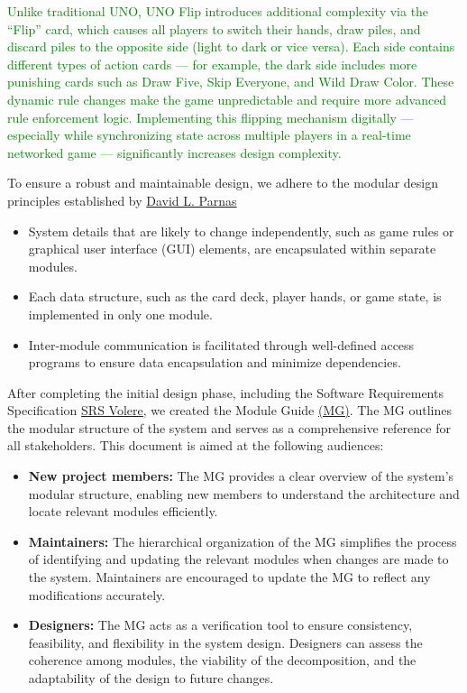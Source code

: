 \documentclass[12pt, titlepage]{article}
\newcommand{\added}[1]{\textcolor{green}{#1}}
\begin{document}
\added{Unlike traditional UNO, UNO Flip introduces additional complexity via the “Flip” card, which causes all players to switch their hands, draw piles, and discard piles to the opposite side (light to dark or vice versa). Each side contains different types of action cards — for example, the dark side includes more punishing cards such as Draw Five, Skip Everyone, and Wild Draw Color. These dynamic rule changes make the game unpredictable and require more advanced rule enforcement logic. Implementing this flipping mechanism digitally — especially while synchronizing state across multiple players in a real-time networked game — significantly increases design complexity.}

To ensure a robust and maintainable design, we adhere to the modular design principles established by \href{https://cabibbo.dia.uniroma3.it/asw/altrui/parnas-1972.pdf}{David L. Parnas}

\begin{itemize}
\item System details that are likely to change independently, such as game rules or graphical user interface (GUI) elements, are encapsulated within separate modules.
\item Each data structure, such as the card deck, player hands, or game state, is implemented in only one module.
\item Inter-module communication is facilitated through well-defined access programs to ensure data encapsulation and minimize dependencies.
\end{itemize}

After completing the initial design phase, including the Software Requirements Specification 
\href{https://github.com/simon-0215/UNO-Flip-3D/tree/main/docs/SRS-Volere}{SRS Volere}, we created the Module Guide \href{https://github.com/simon-0215/UNO-Flip-3D/blob/main/docs/Design/SoftArchitecture/MG.pdf}{(MG)}. The MG outlines the modular structure of the system and serves as a comprehensive reference for all stakeholders. This document is aimed at the following audiences:

\begin{itemize}
\item \textbf{New project members:} The MG provides a clear overview of the system's modular structure, enabling new members to understand the architecture and locate relevant modules efficiently.
\item \textbf{Maintainers:} The hierarchical organization of the MG simplifies the process of identifying and updating the relevant modules when changes are made to the system. Maintainers are encouraged to update the MG to reflect any modifications accurately.
\item \textbf{Designers:} The MG acts as a verification tool to ensure consistency, feasibility, and flexibility in the system design. Designers can assess the coherence among modules, the viability of the decomposition, and the adaptability of the design to future changes.
\end{itemize}
\end{document}
